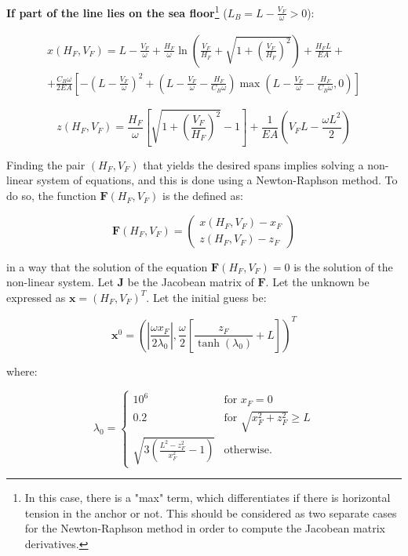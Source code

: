 \documentclass[10pt] {article}
\newcommand{\ba}{\begin{array}}
\newcommand{\ea}{\end{array}}
\newcommand{\om}{\omega}
\begin{document}
\vspace{1cm}
\hspace{1cm}\textbf{If part of the line lies on the sea floor}\footnote{In this case, there is a "max" term, which differentiates if there is horizontal tension in the anchor or not. This should be considered as two separate cases for the Newton-Raphson method in order to compute the Jacobean matrix derivatives.} ($L_B = L - \frac{V_F}{\omega} > 0$):

\begin{multline}
\nonumber
x(H_{F},V_{F}) = L - \frac{V_{F}}{\om} + \frac{H_{F}}{\om} \ln \left( \frac{V_{F}}{H_{F}} + \sqrt{1+\left( \frac{V_{F}}{H_{F}} \right)^{2} } \right)  + \frac{H_{F} L}{EA}+ \\
+ \frac{C_{B} \om}{2 EA} \left[ - \left( L - \frac{V_{F}}{\om} \right)^{2} + \left( L - \frac{V_{F}}{\om}  - \frac{H_{F}}{C_{B}\om}\right) \max \left( L - \frac{V_{F}}{\om} - \frac{H_{F}}{C_{B}\om},0 \right)
\right]
\end{multline}

\begin{equation}
\nonumber
z(H_{F},V_{F}) = \frac{H_{F}}{\om} \left[\sqrt{1+\left( \frac{V_{F}}{H_{F}} \right)^{2} } - 1 \right]
+ \frac{1}{EA} \left( V_{F} L - \frac{\om L^{2}}{2}\right) 
\end{equation}

\vspace{1cm}

Finding the pair $(H_{F},V_{F})$ that yields the desired spans implies solving a non-linear system of equations, and this is done using a Newton-Raphson method. To do so, the function $\mathbf{F}(H_{F},V_{F})$ is the defined as:

$$\mathbf{F}(H_{F},V_{F}) = \left(\ba{c} x(H_{F},V_{F}) - x_{F} \\ z(H_{F},V_{F}) - z_{F} \ea\right)$$

in a way that the solution of the equation $\mathbf{F}(H_{F},V_{F})=0$ is the solution of the non-linear system. Let $\mathbf{J}$ be the Jacobean matrix of $\mathbf{F}$. Let the unknown be expressed as $\mathbf{x} = (H_{F}, V_{F})^T$. Let the initial guess be:

$$ \mathbf{x}^0 = \left(\left| \frac{\om x_{F}}{2 \lambda_{0}}\right|, \frac{\om}{2} \left[\frac{z_{F}}{\tanh(\lambda_{0})} + L \right]\right)^T $$

where:

$$ \lambda_{0} = \left\{ \ba{ll} 
10^{6}                                                 & \text{for } x_{F} = 0 \\ 
0.2                                                    & \text{for } \sqrt{x_{F}^2+z_{F}^2} \geq L \\
\sqrt{3 \left( \frac{L^2-z_{F}^2}{x_{F}^2} - 1 \right)} & \text{otherwise.} \ea \right. $$
\end{document}
